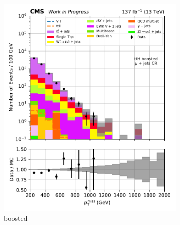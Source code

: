 \begin{figure}[htbp]
    \centering
    \begin{subfigure}[b]{0.24\textwidth}
        \includegraphics[width=\textwidth]{figures/region_plots/2016to18/region_1/ttH_boosted.pdf}
        \caption{\ttH boosted}
    \end{subfigure}
    \hfill
    \begin{subfigure}[b]{0.24\textwidth}

\end{subfigure}
\end{figure}
